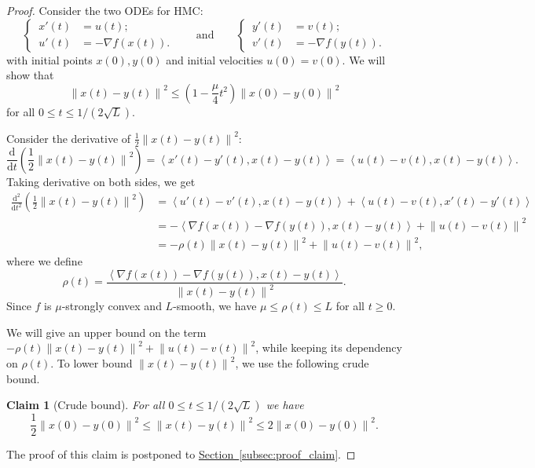 \documentclass[11pt]{article}
\numberwithin{equation}{section}
\newtheorem{claim}[theorem]{Claim}
\theoremstyle{definition}
\theoremstyle{plain}
\newcommand{\expref}[2]{\hyperref[#2]{#1~\ref{#2}}}
\newcommand{\dif}{\mathrm{d}}
\newcommand{\norm}[1]{\left\lVert #1 \right\rVert}
\newcommand{\ip}[2]{\left\langle #1 , #2 \right\rangle}
\newcommand{\grad}{\nabla}
\begin{document}
\begin{proof}%
	Consider the two ODEs for HMC:
	\[
	\left\{\,
	\begin{aligned}
	x'(t) &= u(t);\\
	u'(t) &= -\grad f(x(t)).
	\end{aligned}
	\right.
	\qquad\text{and}\qquad
	\left\{\,
	\begin{aligned}
	y'(t) &= v(t);\\
	v'(t) &= -\grad f(y(t)).
	\end{aligned}
	\right.
	\]
	with initial points $x(0), y(0)$ and initial velocities $u(0) = v(0)$. 
	We will show that
	\[
	\norm{x(t)-y(t)}^2 \leq \left( 1 - \frac{\mu}{4} t^2 \right) \norm{x(0) - y(0)}^2
	\]
	for all $0 \le t \le 1/(2\sqrt{L})$. 
	
	Consider the derivative of $\frac{1}{2} \norm{x(t)-y(t)}^2$:
	\begin{equation}\label{eqn:deri_x-y}
	\frac{\dif}{\dif t} \left( \frac{1}{2} \norm{x(t)-y(t)}^2 \right) = 
	\ip{x'(t)-y'(t)}{x(t)-y(t)} = \ip{u(t)-v(t)}{x(t)-y(t)}.
	\end{equation}
	Taking derivative on both sides, we get
	\begin{align}
	\frac{\dif^2}{\dif t^2} \left( \frac{1}{2} \norm{x(t)-y(t)}^2 \right) 
  &= \ip{u'(t)-v'(t)}{x(t)-y(t)} + \ip{u(t)-v(t)}{x'(t)-y'(t)} \nonumber\\
  &= - \ip{\grad f(x(t)) - \grad f(y(t))}{x(t)-y(t)} + \norm{u(t)-v(t)}^2 \nonumber\\ 
  &= - \rho(t) \norm{x(t)-y(t)}^2 + \norm{u(t)-v(t)}^2, \label{eqn:deri2_x-y}
	\end{align}
where we define
	\[
	\rho(t) = \frac{\ip{\grad f(x(t)) - \grad f(y(t))}{x(t)-y(t)}}{\norm{x(t)-y(t)}^2}.
	\]
	Since $f$ is $\mu$-strongly convex and $L$-smooth, we have $\mu \le \rho(t) \le L$ for all $t\geq 0$.
	
We will %
give an upper bound on  %
the term $- \rho(t)\norm{x(t)-y(t)}^2 + \norm{u(t)-v(t)}^2$, while keeping its dependency on $\rho(t)$. To lower bound $\norm{x(t)-y(t)}^2$, we use the following crude bound.
	\begin{claim}[Crude bound]
		\label{claim:crude-bound}
		For all $0 \le t \le 1/(2\sqrt{L})$ we have
		\begin{equation}\label{eqn:crude_bound}
		\frac{1}{2} \norm{x(0) - y(0)}^2 \le \norm{x(t)-y(t)}^2 \le 2 \norm{x(0) - y(0)}^2.
		\end{equation}
	\end{claim}
	\noindent
	The proof of this claim is postponed to \expref{Section}{subsec:proof_claim}. 
	

\end{proof}
\end{document}
